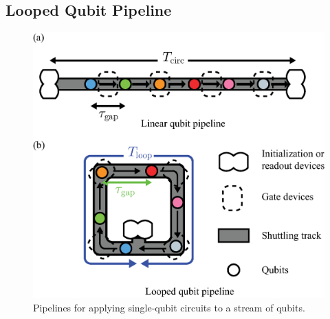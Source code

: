 \documentclass[a4paper,11pt]{ltjsarticle}
\begin{document}
{    \subsection{Looped Qubit Pipeline}{
        \begin{figure}[h]
            \centering
            \includegraphics[scale=0.45]{figure/shuttling_track.eps}
            \vspace{0pt}\caption{Pipelines for applying single-qubit circuits to a stream of qubits.}
            \label{shuttling_truck}
        \end{figure}

}}
\end{document}
